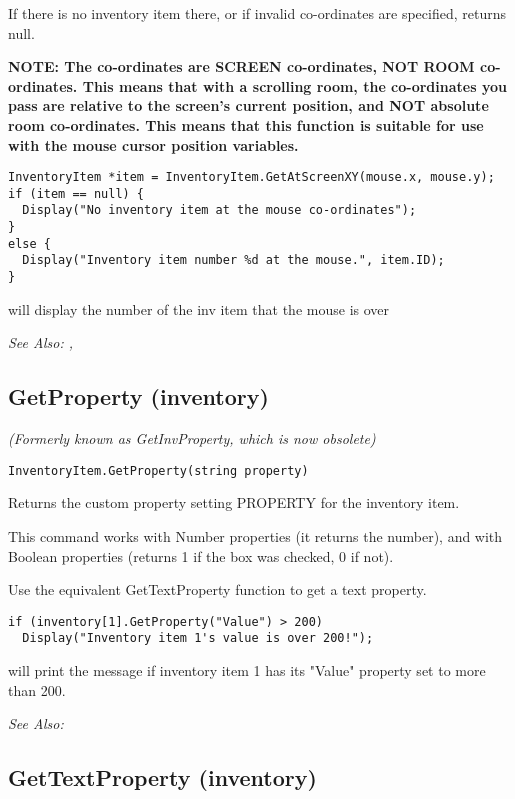 If there is no inventory item there, or if invalid co-ordinates are specified,
returns null.

\bf{NOTE:} The co-ordinates are SCREEN co-ordinates, NOT ROOM co-ordinates. This
means that with a scrolling room, the co-ordinates you pass are relative to
the screen's current position, and NOT absolute room co-ordinates. This
means that this function is suitable for use with the mouse cursor position
variables.

\begin{verbatim}
InventoryItem *item = InventoryItem.GetAtScreenXY(mouse.x, mouse.y);
if (item == null) {
  Display("No inventory item at the mouse co-ordinates");
}
else {
  Display("Inventory item number %d at the mouse.", item.ID);
}
\end{verbatim}
will display the number of the inv item that the mouse is over

\it{See Also:} ,


\subsection{GetProperty (inventory)}\label{InventoryItem.GetProperty}%

\it{(Formerly known as GetInvProperty, which is now obsolete)}

\begin{verbatim}
InventoryItem.GetProperty(string property)
\end{verbatim}
Returns the custom property setting PROPERTY for the inventory item.

This command works with Number properties (it returns the number), and with Boolean
properties (returns 1 if the box was checked, 0 if not).

Use the equivalent GetTextProperty function to get a text property.

\begin{verbatim}
if (inventory[1].GetProperty("Value") > 200)
  Display("Inventory item 1's value is over 200!");
\end{verbatim}
will print the message if inventory item 1 has its "Value" property set to more than 200.

\it{See Also:} 


\subsection{GetTextProperty (inventory)}\label{InventoryItem.GetTextProperty}%

